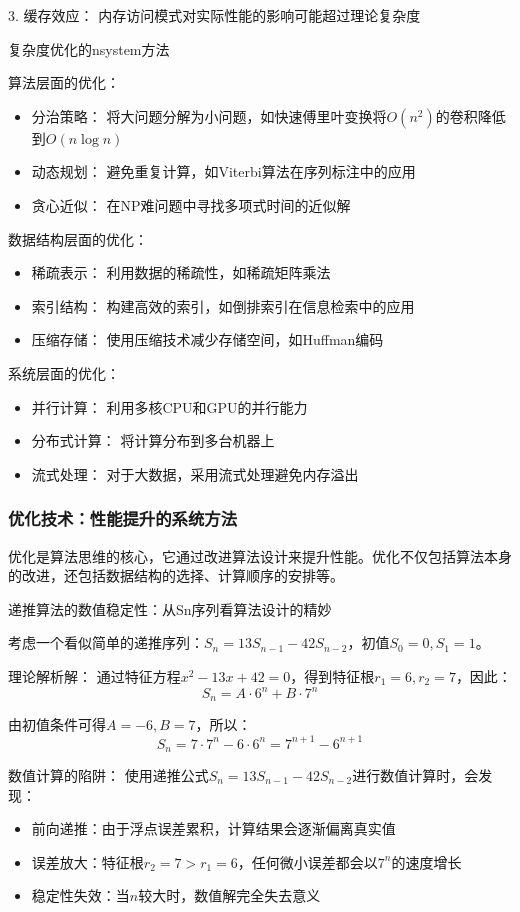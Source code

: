 3. 缓存效应： 内存访问模式对实际性能的影响可能超过理论复杂度

复杂度优化的nsystem方法

算法层面的优化：
\begin{itemize}
\item 分治策略： 将大问题分解为小问题，如快速傅里叶变换将$O(n^2)$的卷积降低到$O(n \log n)$
\item 动态规划： 避免重复计算，如Viterbi算法在序列标注中的应用
\item 贪心近似： 在NP难问题中寻找多项式时间的近似解
\end{itemize}

数据结构层面的优化：
\begin{itemize}
\item 稀疏表示： 利用数据的稀疏性，如稀疏矩阵乘法
\item 索引结构： 构建高效的索引，如倒排索引在信息检索中的应用
\item 压缩存储： 使用压缩技术减少存储空间，如Huffman编码
\end{itemize}

系统层面的优化：
\begin{itemize}
\item 并行计算： 利用多核CPU和GPU的并行能力
\item 分布式计算： 将计算分布到多台机器上
\item 流式处理： 对于大数据，采用流式处理避免内存溢出
\end{itemize}

\subsubsection{优化技术：性能提升的系统方法}

优化是算法思维的核心，它通过改进算法设计来提升性能。优化不仅包括算法本身的改进，还包括数据结构的选择、计算顺序的安排等。

递推算法的数值稳定性：从Sn序列看算法设计的精妙

考虑一个看似简单的递推序列：$S_n = 13S_{n-1} - 42S_{n-2}$，初值$S_0 = 0, S_1 = 1$。

理论解析解：
通过特征方程$x^2 - 13x + 42 = 0$，得到特征根$r_1 = 6, r_2 = 7$，因此：
$$S_n = A \cdot 6^n + B \cdot 7^n$$

由初值条件可得$A = -6, B = 7$，所以：
$$S_n = 7 \cdot 7^n - 6 \cdot 6^n = 7^{n+1} - 6^{n+1}$$

数值计算的陷阱：
使用递推公式$S_n = 13S_{n-1} - 42S_{n-2}$进行数值计算时，会发现：

\begin{itemize}
\item 前向递推：由于浮点误差累积，计算结果会逐渐偏离真实值
\item 误差放大：特征根$r_2 = 7 > r_1 = 6$，任何微小误差都会以$7^n$的速度增长
\item 稳定性失效：当$n$较大时，数值解完全失去意义
\end{itemize}

